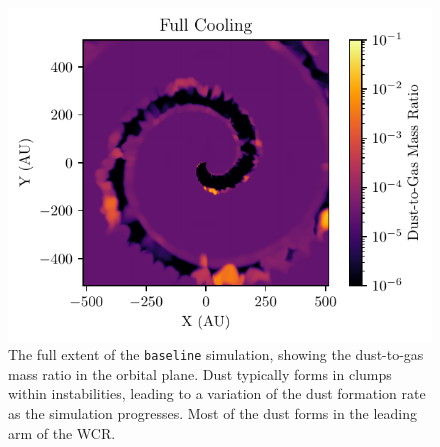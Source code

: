 \begin{figure}
  \centering
  \includegraphics{assets/results/radiative/z.pdf}
  \caption[\texttt{Baseline} simulation $z$, full extent]{The full extent of the \texttt{baseline} simulation, showing the dust-to-gas mass ratio in the orbital plane. Dust typically forms in clumps within instabilities, leading to a variation of the dust formation rate as the simulation progresses. Most of the dust forms in the leading arm of the WCR.}
  \label{fig:full-radiative-z}
\end{figure}




